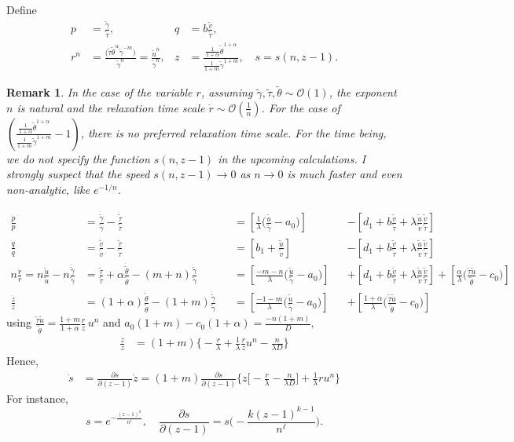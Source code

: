 \documentclass[a4paper,11pt]{article}
\def\blue{\color{blue}}
\def\tg{{\tilde{\gamma}}}
\def\tv{{\tilde{v}}}
\def\tth{{\tilde{\theta}}}
\def\ts{{\tilde{\tau}}}
\def\tu{{\tilde{u}}}
\def\dtg{\dot{\tilde{\gamma}}}
\def\dtv{\dot{\tilde{v}}}
\def\dtth{\dot{\tilde{\theta}}}
\def\dts{\dot{\tilde{\tau}}}
\def\dtu{\dot{\tilde{u}}}
\def\dpp{\dot{p}}
\def\dqq{\dot{q}}
\def\drr{\dot{r}}
\newtheorem{remark}{Remark}[section]
\begin{document}
Define 
\begin{equation}\label{eq:pqrsdef}
 \begin{aligned}
  p &= \frac{\tg}{\ts}, & q&=b \frac{\tv}{\ts},\\
  r^n &= \frac{\big(\ts\tth^\alpha \tg^{-m}\big)}{\tg^n}= \frac{\tu^n}{\tg^n} , & z&=\frac{ \frac{1}{1+\alpha}\tth^{1+\alpha}}{ \frac{1}{1+m}\tg^{1+m} } , \quad s=s(n,z-1).
 \end{aligned}
\end{equation}
\begin{remark}
 In the case of the variable $r$, assuming $\tg, \ts,\tth \sim \mathcal{O}(1)$, the exponent $n$ is natural and the relaxation time scale $\drr \sim \mathcal{O}(\frac{1}{n})$. For the case of $\displaystyle\left(\frac{ \frac{1}{1+\alpha}\tth^{1+\alpha}}{ \frac{1}{1+m}\tg^{1+m} } -1 \right)$, there is no preferred relaxation time scale. For the time being, we do not specify the function $s(n,z-1)$ in the upcoming calculations. {\blue I strongly suspect that the speed $s(n,z-1) \rightarrow 0$ as $n \rightarrow 0$ is much faster and even non-analytic, like $e^{-1/n}$.}
\end{remark}
\begin{align*}
 \frac{\dpp}{p}&=\frac{\dtg}{\tg} - \frac{\dts}{\ts}& &=\left[\frac{1}{\lambda }\Big(\frac{\tu}{\tg}-a_0\Big)\right] & &-\left[d_1 + b\frac{\tv}{\ts} + \lambda\frac{\tu}{\tv}\frac{\tv}{\ts}\right]\\
 \frac{\dqq}{q}&=\frac{\dtv}{\tv} - \frac{\dts}{\ts}& &=\left[b_1 +\frac{\tu}{\tv}\right] & &-\left[d_1 + b\frac{\tv}{\ts} + \lambda\frac{\tu}{\tv}\frac{\tv}{\ts}\right]\\
 n\frac{\drr}{r}=n\frac{\dtu}{\tu} - n\frac{\dtg}{\tg} &= \frac{\dts}{\ts} +\alpha \frac{\dtth}{\tth} - (m+n) \frac{\dtg}{\tg}& &=\left[\frac{-m-n}{\lambda }\Big(\frac{\tu}{\tg}-a_0\Big)\right]& &+\left[d_1 + b\frac{\tv}{\ts} + \lambda\frac{\tu}{\tv}\frac{\tv}{\ts}\right]+\left[\frac{\alpha}{\lambda }\Big(\frac{\ts\tu}{\tth}-c_0\Big)\right]\\
 \frac{\dot{z}}{z} &= (1+\alpha)\frac{\dtth}{\tth} - (1+m)\frac{\dtg}{\tg} & &=\left[\frac{-1-m}{\lambda }\Big(\frac{\tu}{\tg}-a_0\Big)\right] & &+ \left[\frac{1+\alpha}{\lambda }\Big(\frac{\ts\tu}{\tth}-c_0\Big)\right]
\end{align*}
using $\displaystyle \frac{\ts\tu}{\tth} = \frac{1+m}{1+\alpha} \frac{r}{z}\,u^n$ \quad and \quad$\displaystyle a_0(1+m)-c_0(1+\alpha)=\frac{-n(1+m)}{D}, $
\begin{align*}
 \frac{\dot{z}}{z} &=(1+m)\bigg\{-\frac{r}{\lambda} + \frac{1}{\lambda}\frac{r}{z}u^n - \frac{n}{\lambda D}\bigg\}
\end{align*}
Hence,
\begin{align*}
 \dot{s} &=\frac{\partial s}{\partial (z-1)} \dot{z} = (1+m)\frac{\partial s}{\partial (z-1)} \bigg\{z\big[-\frac{r}{\lambda} - \frac{n}{\lambda D}\Big]+ \frac{1}{\lambda}ru^n\bigg\}
\end{align*}
For instance,
$$ s = e^{-\frac{(z-1)^k}{n^\ell}}, \quad \frac{\partial s}{\partial (z-1)} = s\big(-\frac{k(z-1)^{k-1}}{n^\ell}\big).$$
\end{document}
